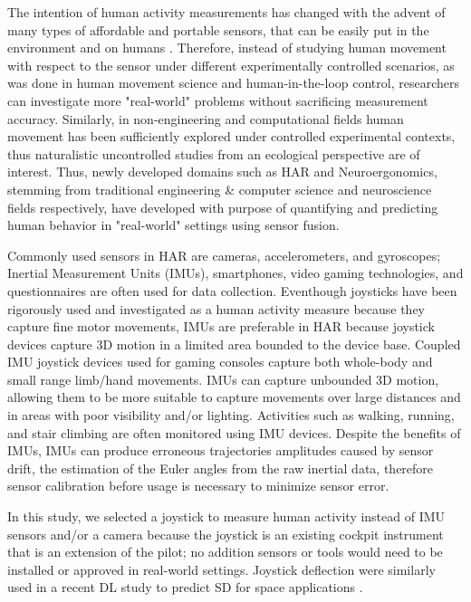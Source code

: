 \documentclass{ieeeaccess}
\begin{document}
The intention of human activity measurements has changed with the advent of many types of affordable and portable sensors, that can be easily put in the environment and on humans \cite{Fu_2020_Sensing}. Therefore, instead of studying human movement with respect to the sensor under different experimentally controlled scenarios, as was done in human movement science and human-in-the-loop control, researchers can investigate more "real-world" problems without sacrificing measurement accuracy. Similarly, in non-engineering and computational fields human movement has been sufficiently explored under controlled experimental contexts, thus naturalistic uncontrolled studies from an ecological perspective are of interest. Thus, newly developed domains such as HAR and Neuroergonomics, stemming from traditional engineering \& computer science and neuroscience fields respectively, have developed with purpose of quantifying and predicting human behavior in "real-world" settings using sensor fusion. 

Commonly used sensors in HAR are cameras, accelerometers, and gyroscopes; Inertial Measurement Units (IMUs), smartphones, video gaming technologies, and questionnaires are often used for data collection. Eventhough joysticks have been rigorously used and investigated as a human activity measure because they capture fine motor movements, IMUs are preferable in HAR because joystick devices capture 3D motion in a limited area bounded to the device base. Coupled IMU joystick devices used for gaming consoles capture both whole-body and small range limb/hand movements. IMUs can capture unbounded 3D motion, allowing them to be more suitable to capture movements over large distances and in areas with poor visibility and/or lighting. Activities such as walking, running, and stair climbing are often monitored using IMU devices. Despite the benefits of IMUs, IMUs can produce erroneous trajectories amplitudes caused by sensor drift, the estimation of the Euler angles from the raw inertial data, therefore sensor calibration before usage is necessary to minimize sensor error.

In this study, we selected a joystick to measure human activity instead of IMU sensors and/or a camera because the joystick is an existing cockpit instrument that is an extension of the pilot; no addition sensors or tools would need to be installed or approved in real-world settings. Joystick deflection were similarly used in a recent DL study to predict SD for space applications \cite{Wang_2022_Crash}.  
\end{document}

